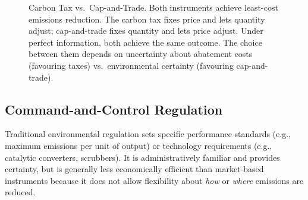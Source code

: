 \begin{figure}[H]
\centering
{}
\caption{Carbon Tax vs.\ Cap-and-Trade. Both instruments achieve least-cost emissions
  reduction. The carbon tax fixes price and lets quantity adjust; cap-and-trade fixes
  quantity and lets price adjust. Under perfect information, both achieve the same outcome.
  The choice between them depends on uncertainty about abatement costs (favouring taxes)
  vs.\ environmental certainty (favouring cap-and-trade).}
\label{fig:carbon_instruments}
\end{figure}

\subsection{Command-and-Control Regulation}

Traditional environmental regulation sets specific performance standards (e.g., maximum emissions per unit of output) or technology requirements (e.g., catalytic converters, scrubbers). It is administratively familiar and provides certainty, but is generally less economically efficient than market-based instruments because it does not allow flexibility about \textit{how} or \textit{where} emissions are reduced.


